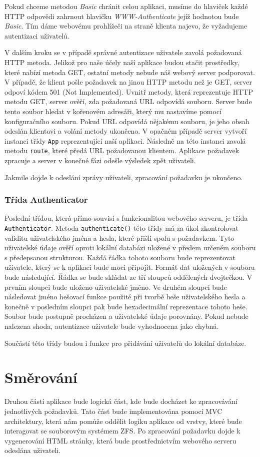     Pokud chceme metodou \emph{Basic} chránit celou aplikaci, musíme do hlaviček každé HTTP odpovědi zahrnout hlavičku \emph{WWW-Authenticate} jejíž hodnotou bude \emph{Basic}. Tím dáme webovému prohlížeči na straně klienta najevo, že vyžadujeme autentizaci uživatelů.

    V dalším kroku se v případě správné autentizace uživatele zavolá požadovaná HTTP metoda. Jelikož pro naše účely naší aplikace budou stačit prostředky, které nabízí metoda GET, ostatní metody nebude náš webový server podporovat. V případě, že klient pošle požadavek na jinou HTTP metodu než je GET, server odpoví kódem 501 (Not Implemented). Uvnitř metody, která reprezentuje HTTP metodu GET, server ověří, zda požadovaná URL odpovídá souboru. Server bude tento soubor hledat v kořenovém adresáři, který mu nastavíme pomocí konfiguračního souboru. Pokud URL odpovídá nějakému souboru, je jeho obsah odeslán klientovi a volání metody ukončeno. V opačném případě server vytvoří instanci třídy \verb|App| reprezentující naší aplikaci. Následně na této instanci zavolá metodu \verb|route|, které předá URL požadovanou klientem. Aplikace požadavek zpracuje a server v konečné fázi odešle výsledek zpět uživateli.

    Jakmile dojde k odeslání zprávy uživateli, zpracování požadavku je ukončeno.
    \subsubsection{Třída Authenticator}
    Poslední třídou, která přímo souvisí s funkcionalitou webového serveru, je třída \verb|Authenticator|. Metoda \verb|authenticate()| této třídy má za úkol zkontrolovat validitu uživatelského jména a hesla, které přišli spolu s požadavkem. Tyto uživatelské údaje ověří oproti lokální databázi uložené v předem určeném souboru s předepsanou strukturou. Každá řádka tohoto souboru bude reprezentovat uživatele, který se k aplikaci bude moci připojit. Formát dat uložených v souboru bude následující. Řádka se bude skládat ze tří sloupců oddělených dvojtečkou. V prvním sloupci bude uloženo uživatelské jméno. Ve druhém sloupci bude následovat jméno hešovací funkce použité při tvorbě heše uživatelského hesla a konečně v posledním sloupci pak bude hexadecimální reprezentace tohoto heše. Soubor bude postupně procházen a uživatelské údaje porovnány. Pokud nebude nalezena shoda, autentizace uživatele bude vyhodnocena jako chybná.

    Součástí této třídy budou i funkce pro přidávání uživatelů do lokální databáze.
\section{Směrování}
\label{route}
Druhou částí aplikace bude logická část, kde bude docházet ke zpracovávání jednotlivých požadavků. Tato část bude implementována pomocí MVC architektury, která nám pomůže oddělit logiku aplikace od vrstvy, které bude interagovat se souborovým systémem ZFS. Po zpracování požadavku dojde k vygenerování HTML stránky, která bude prostřednictvím webového serveru odeslána uživateli.

